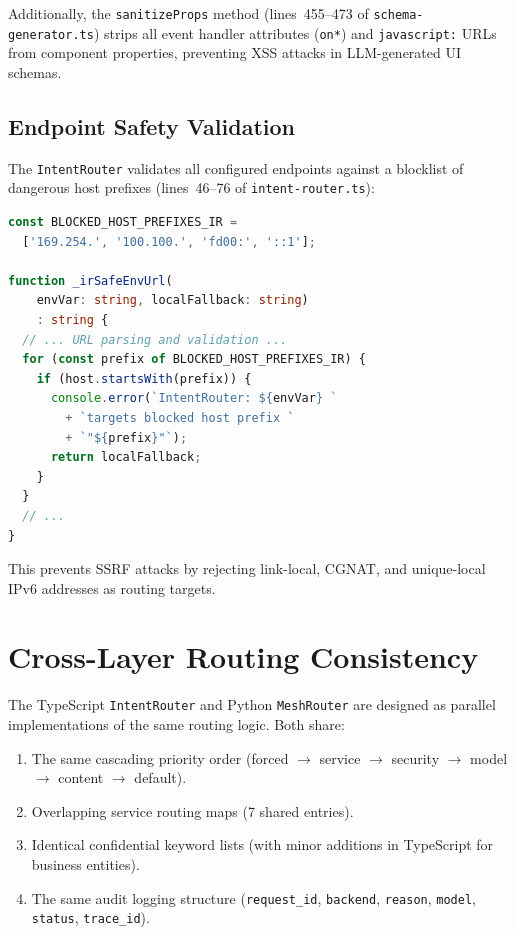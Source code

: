 \documentclass[11pt]{article}
\begin{document}
Additionally, the \texttt{sanitizeProps} method (lines~455--473 of
\texttt{schema-generator.ts}) strips all event handler attributes
(\texttt{on*}) and \texttt{javascript:} URLs from component properties,
preventing XSS attacks in LLM-generated UI schemas.

\subsection{Endpoint Safety Validation}

The \texttt{IntentRouter} validates all configured endpoints against a
blocklist of dangerous host prefixes (lines~46--76 of
\texttt{intent-router.ts}):

\begin{lstlisting}[language=TypeScript,caption={Blocked host prefixes (intent-router.ts, lines 46--76)},firstnumber=46]
const BLOCKED_HOST_PREFIXES_IR =
  ['169.254.', '100.100.', 'fd00:', '::1'];

function _irSafeEnvUrl(
    envVar: string, localFallback: string)
    : string {
  // ... URL parsing and validation ...
  for (const prefix of BLOCKED_HOST_PREFIXES_IR) {
    if (host.startsWith(prefix)) {
      console.error(`IntentRouter: ${envVar} `
        + `targets blocked host prefix `
        + `"${prefix}"`);
      return localFallback;
    }
  }
  // ...
}
\end{lstlisting}

This prevents SSRF attacks by rejecting link-local, CGNAT, and unique-local
IPv6 addresses as routing targets.

\section{Cross-Layer Routing Consistency}
\label{sec:consistency}

The TypeScript \texttt{IntentRouter} and Python \texttt{MeshRouter} are
designed as parallel implementations of the same routing logic. Both share:

\begin{enumerate}
  \item The same cascading priority order (forced $\rightarrow$ service
        $\rightarrow$ security $\rightarrow$ model $\rightarrow$ content
        $\rightarrow$ default).
  \item Overlapping service routing maps (7 shared entries).
  \item Identical confidential keyword lists (with minor additions in
        TypeScript for business entities).
  \item The same audit logging structure (\texttt{request\_id},
        \texttt{backend}, \texttt{reason}, \texttt{model}, \texttt{status},
        \texttt{trace\_id}).
\end{enumerate}
\end{document}
